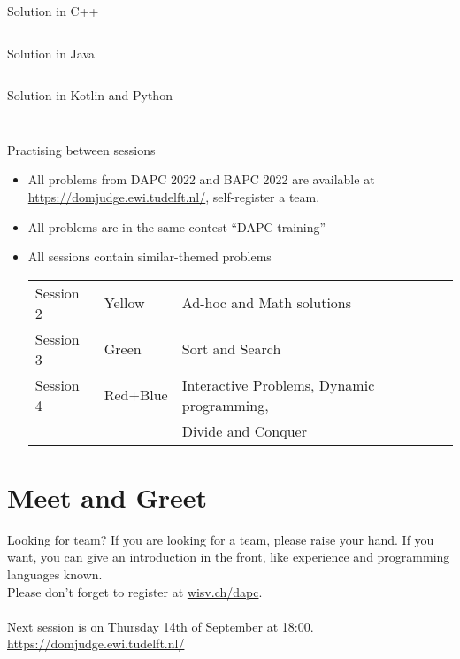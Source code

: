 \documentclass[11pt,pdf, aspectratio=169]{beamer}
\begin{document}
  \begin{frame}[containsverbatim]{Solution in C++}
    \inputminted{c++}{code/session-1/c++/dapc-f.cpp}
  \end{frame}
  \begin{frame}[containsverbatim]{Solution in Java}
    \inputminted{java}{code/session-1/java/DAPCF.java}
  \end{frame}
  \begin{frame}[containsverbatim]{Solution in Kotlin and Python}
    \inputminted{kotlin}{code/session-1/kotlin/dapc-f.kt}
    \inputminted{python}{code/session-1/python/dapc-f.py}
  \end{frame}
  \begin{frame}{Practising between sessions}
    \begin{itemize}
      \item All problems from DAPC 2022 and BAPC 2022 are available at \url{https://domjudge.ewi.tudelft.nl/}, self-register a team.
      \item All problems are in the same contest ``DAPC-training''
      \item All sessions contain similar-themed problems\\
      \begin{tabular}{lll}
        \hline
        Session 2 & Yellow   & Ad-hoc and Math solutions                  \\
        Session 3 & Green    & Sort and Search                            \\
        Session 4 & Red+Blue & Interactive Problems, Dynamic programming, \\
                  &          & Divide and Conquer                         \\
        \hline
      \end{tabular}
    \end{itemize}
  \end{frame}


  \section{Meet and Greet}
  \begin{frame}{Looking for team?}
    If you are looking for a team, please raise your hand.
    If you want, you can give an introduction in the front, like experience and programming languages known.\\
    Please don't forget to register at \url{wisv.ch/dapc}.\\\\
    Next session is on Thursday 14th of September at 18:00.\\

    \url{https://domjudge.ewi.tudelft.nl/}
  \end{frame}
\end{document}

